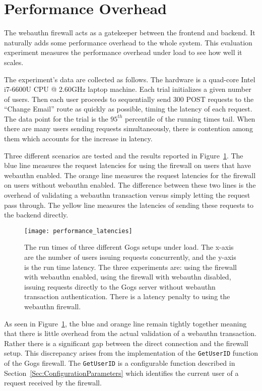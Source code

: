 \section{Performance Overhead}

The webauthn firewall acts as a gatekeeper between the frontend and backend. It naturally adds some performance overhead to the whole system. This evaluation experiment measures the performance overhead under load to see how well it scales. 

The experiment's data are collected as follows. The hardware is a quad-core Intel i7-6600U CPU @ 2.60GHz laptop machine. Each trial initializes a given number of users. Then each user proceeds to sequentially send 300 POST requests to the ``Change Email'' route as quickly as possible, timing the latency of each request. The data point for the trial is the $95^{th}$ percentile of the running times tail. When there are many users sending requests simultaneously, there is contention among them which accounts for the increase in latency.

Three different scenarios are tested and the results reported in Figure~\ref{Fig:PerformanceOverhead}. The blue line measures the request latencies for using the firewall on users that have webauthn enabled. The orange line measures the request latencies for the firewall on users without webauthn enabled. The difference between these two lines is the overhead of validating a webauthn transaction versus simply letting the request pass through. The yellow line measures the latencies of sending these requests to the backend directly.

\begin{figure}[h]
  \centering
  \texttt{[image: performance\_latencies]}
  \caption{The run times of three different Gogs setups under load. The x-axis are the number of users issuing requests concurrently, and the y-axis is the run time latency. The three experiments are: using the firewall with webauthn enabled, using the firewall with webauthn disabled, issuing requests directly to the Gogs server without webauthn transaction authentication. There is a latency penalty to using the webauthn firewall.}
  \label{Fig:PerformanceOverhead}
\end{figure}

As seen in Figure~\ref{Fig:PerformanceOverhead}, the blue and orange line remain tightly together meaning that there is little overhead from the actual validation of a webauthn transaction. Rather there is a significant gap between the direct connection and the firewall setup. This discrepancy arises from the implementation of the \lstinline{GetUserID} function of the Gogs firewall. The \lstinline{GetUserID} is a configurable function described in Section~\ref{Sec:ConfigurationParameters} which identifies the current user of a request received by the firewall. 

